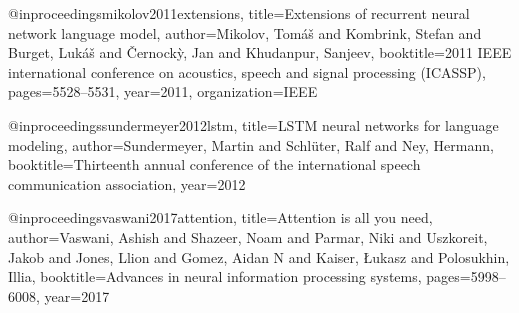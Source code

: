 @inproceedings{mikolov2011extensions,
  title={Extensions of recurrent neural network language model},
  author={Mikolov, Tom{\'a}{\v{s}} and Kombrink, Stefan and Burget, Luk{\'a}{\v{s}} and {\v{C}}ernock{\`y}, Jan and Khudanpur, Sanjeev},
  booktitle={2011 IEEE international conference on acoustics, speech and signal processing (ICASSP)},
  pages={5528--5531},
  year={2011},
  organization={IEEE}
}

@inproceedings{sundermeyer2012lstm,
  title={LSTM neural networks for language modeling},
  author={Sundermeyer, Martin and Schl{\"u}ter, Ralf and Ney, Hermann},
  booktitle={Thirteenth annual conference of the international speech communication association},
  year={2012}
}

@inproceedings{vaswani2017attention,
  title={Attention is all you need},
  author={Vaswani, Ashish and Shazeer, Noam and Parmar, Niki and Uszkoreit, Jakob and Jones, Llion and Gomez, Aidan N and Kaiser, {\L}ukasz and Polosukhin, Illia},
  booktitle={Advances in neural information processing systems},
  pages={5998--6008},
  year={2017}
}






















